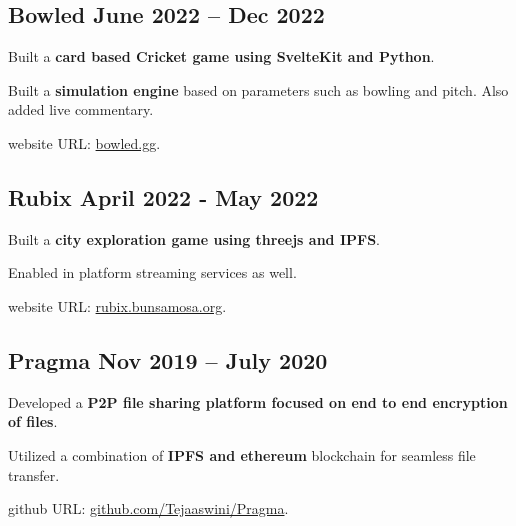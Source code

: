 \subsection{{Bowled \hfill June 2022 – Dec 2022}}
\begin{zitemize}
\item Built a \textbf{card based Cricket game using SvelteKit and Python}.
\item Built a \textbf{simulation engine} based on parameters such as bowling and pitch. Also added live commentary. 
\item website URL: \href{https://bowled.gg/}{bowled.gg}.
\end{zitemize}

\subsection{{Rubix \hfill April 2022 - May 2022}}
\begin{zitemize}
\item Built a \textbf{city exploration game using threejs and IPFS}.
\item Enabled in platform streaming services as well. 
\item website URL: \href{https://rubix.bunsamosa.org/}{rubix.bunsamosa.org}.
\end{zitemize}

\subsection{{Pragma \hfill Nov 2019 – July 2020}}
\begin{zitemize}
\item Developed a \textbf{P2P file sharing platform focused on end to end encryption of files}.
\item Utilized a combination of \textbf{IPFS and ethereum} blockchain for seamless file transfer. 
\item github URL: \href{https://github.com/Tejaaswini/Pragma}{github.com/Tejaaswini/Pragma}.
\end{zitemize}